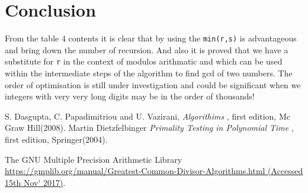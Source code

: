 \documentclass[12pt]{article}
\begin{document}
\section{Conclusion}
From the table 4 contents it is clear that by using the \texttt{min(r,s)} is advantageous and bring down the number of recursion. And also it is proved that we have a substitute for \texttt{r} in the context of modulos arithmatic and which can be used within the intermediate steps of the algorithm to find gcd of two numbers. The order of optimisation is still under investigation and could be significant when we integers with very very long digits may be in the order of thousands!


\begin{thebibliography}{6}

S. Dasgupta, C. Papadimitriou and U. Vazirani, \textsl{Algorithims
},
first edition, Mc Graw Hill(2008).
Martin Dietzfelbinger \textsl{Primality Testing in Polynomial Time
},
first edition, Springer(2004).

The GNU Multiple Precision Arithmetic Library \url{https://gmplib.org/manual/Greatest-Common-Divisor-Algorithms.html (Accessed 15th Nov' 2017)}.

\end{thebibliography}
\end{document}
